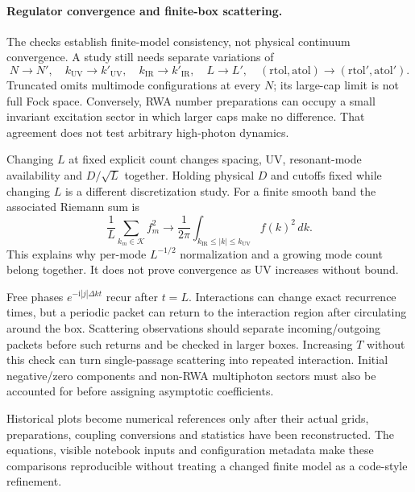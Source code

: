 \documentclass[11pt,a4paper]{article}
\newcommand{\ii}{\mathrm{i}}
\newcommand{\K}{\mathcal K}
\begin{document}
\paragraph{Regulator convergence and finite-box scattering.}
The checks establish finite-model consistency, not physical continuum convergence.
A study still needs separate variations of
\begin{equation}
 N\to N',\quad k_{\mathrm{UV}}\to k'_{\mathrm{UV}},\quad
 k_{\mathrm{IR}}\to k'_{\mathrm{IR}},\quad L\to L',\quad
 (\mathrm{rtol},\mathrm{atol})\to(\mathrm{rtol}',\mathrm{atol}').
 \label{eq:regulators}
\end{equation}
Truncated omits multimode configurations at every $N$; its large-cap limit
is not full Fock space. Conversely, RWA number preparations can occupy a
small invariant excitation sector in which larger caps make no difference.
That agreement does not test arbitrary high-photon dynamics.

Changing $L$ at fixed explicit count changes spacing, UV, resonant-mode
availability and $D/\sqrt L$ together. Holding physical $D$ and cutoffs fixed
while changing $L$ is a different discretization study. For a finite smooth
band the associated Riemann sum is
\begin{equation}
 \frac1L\sum_{k_m\in\K}f_m^2\longrightarrow
 \frac1{2\pi}\int_{k_{\mathrm{IR}}\leq|k|\leq k_{\mathrm{UV}}}f(k)^2\,dk.
 \label{eq:continuumweight}
\end{equation}
This explains why per-mode $L^{-1/2}$ normalization and a growing mode count
belong together. It does not prove convergence as UV increases without bound.

Free phases $e^{-\ii|j|\Delta k t}$ recur after $t=L$. Interactions can change
exact recurrence times, but a periodic packet can return to the interaction
region after circulating around the box. Scattering observations should
separate incoming/outgoing packets before such returns and be checked in
larger boxes. Increasing $T$ without this check can turn single-passage
scattering into repeated interaction. Initial negative/zero components and
non-RWA multiphoton sectors must also be accounted for before assigning
asymptotic coefficients.

Historical plots become numerical references only after their actual grids,
preparations, coupling conversions and statistics have been reconstructed.
The equations, visible notebook inputs and configuration metadata make these
comparisons reproducible without treating a changed finite model as a
code-style refinement.
\end{document}
